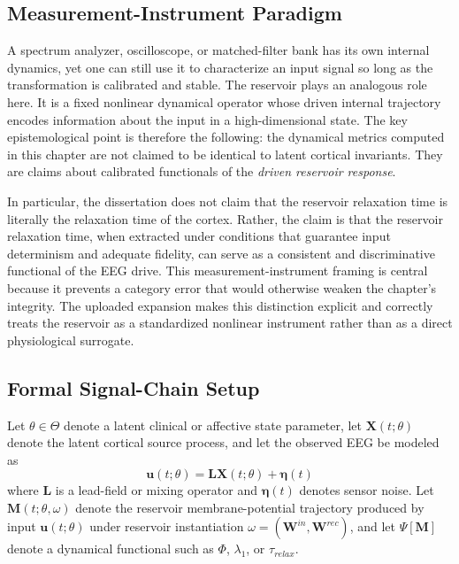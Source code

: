 \subsection{Measurement-Instrument Paradigm}

A spectrum analyzer, oscilloscope, or matched-filter bank has its own internal dynamics, yet one can still use it to characterize an input signal so long as the transformation is calibrated and stable. The reservoir plays an analogous role here. It is a fixed nonlinear dynamical operator whose driven internal trajectory encodes information about the input in a high-dimensional state. The key epistemological point is therefore the following: the dynamical metrics computed in this chapter are not claimed to be identical to latent cortical invariants. They are claims about calibrated functionals of the \emph{driven reservoir response}.

In particular, the dissertation does not claim that the reservoir relaxation time is literally the relaxation time of the cortex. Rather, the claim is that the reservoir relaxation time, when extracted under conditions that guarantee input determinism and adequate fidelity, can serve as a consistent and discriminative functional of the EEG drive. This measurement-instrument framing is central because it prevents a category error that would otherwise weaken the chapter's integrity. The uploaded expansion makes this distinction explicit and correctly treats the reservoir as a standardized nonlinear instrument rather than as a direct physiological surrogate.

\subsection{Formal Signal-Chain Setup}

Let $\theta \in \Theta$ denote a latent clinical or affective state parameter, let $\mathbf{X}(t;\theta)$ denote the latent cortical source process, and let the observed EEG be modeled as
\begin{equation}
\mathbf{u}(t;\theta)=\mathbf{L}\mathbf{X}(t;\theta)+\boldsymbol{\eta}(t)
\end{equation}
where $\mathbf{L}$ is a lead-field or mixing operator and $\boldsymbol{\eta}(t)$ denotes sensor noise. Let $\mathbf{M}(t;\theta,\omega)$ denote the reservoir membrane-potential trajectory produced by input $\mathbf{u}(t;\theta)$ under reservoir instantiation $\omega=(\mathbf{W}^{in},\mathbf{W}^{rec})$, and let $\Psi[\mathbf{M}]$ denote a dynamical functional such as $\Phi$, $\lambda_1$, or $\tau_{relax}$.

